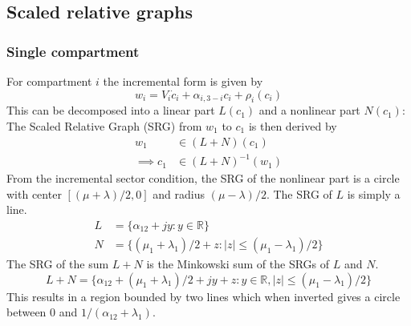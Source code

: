 \documentclass{article}
\begin{document}
\subsection{Scaled relative graphs}

\subsubsection{Single compartment}

For compartment $i$ the incremental form is given by
\begin{equation}
    w_i = V_i \dot{c}_i + \alpha_{i,3-i} c_i + \rho_i(c_i)
\end{equation}
This can be decomposed into a linear part $L(c_1)$ and a nonlinear part $N(c_1)$:
The Scaled Relative Graph (SRG) from $w_1$ to $c_1$ is then derived by
\begin{align}
    w_1 &\in (L + N)(c_1) \\
    \implies c_1 &\in (L + N)^{-1}(w_1) 
\end{align}
From the incremental sector condition, the SRG of the nonlinear part is a circle with center $[(\mu+\lambda)/2, 0]$ and radius $(\mu-\lambda)/2$.
The SRG of $L$ is simply a line.
\begin{align}
    L &= \{ \alpha_{12} + j y : y \in \mathbb{R} \} \\
    N &= \{ (\mu_1 + \lambda_1)/2 + z : |z| \leq (\mu_1 - \lambda_1)/2 \}
\end{align}
The SRG of the sum $L + N$ is the Minkowski sum of the SRGs of $L$ and $N$.
\begin{equation}
    L + N = \{ \alpha_{12} + (\mu_1 + \lambda_1)/2 + jy + z : y \in \mathbb{R}, |z| \leq (\mu_1 - \lambda_1)/2 \}
\end{equation}
This results in a region bounded by two lines which when inverted gives a circle between 0 and $1/(\alpha_{12} + \lambda_1)$.
\end{document}
